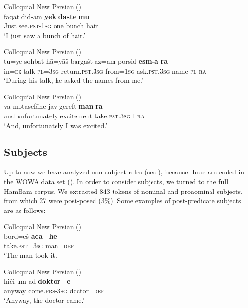 \documentclass[output=paper,colorlinks,citecolor=brown,draftmode]{langscibook}
\begin{document}
\ea\label{Persian:ex:29}
Colloquial New Persian (\citealt[Q, 1919]{Izadi2022Persian}) \\
\gll faqat did-am \textbf{yek} \textbf{daste} \textbf{mu} \\
Just see\textsc{.pst-1sg} one bunch hair \\
\glt `I just saw a bunch of hair.'
\z

\ea\label{Persian:ex:30}
Colloquial New Persian (\citealt[ZB, 3034]{Izadi2022Persian}) \\
\gll tu=ye sohbat-hā=yāš bargašt az=am porsid \textbf{esm-ā} \textbf{rā} \\
in\textsc{=ez} talk\textsc{-pl=3sg} return\textsc{.pst.3sg} from\textsc{=1sg} ask\textsc{.pst.3sg} name\textsc{-pl} \textsc{ra} \\
\glt `During his talk, he asked the names from me.'
\z

\ea\label{Persian:ex:31}
Colloquial New Persian (\citealt[ZA, 2939]{Izadi2022Persian}) \\
\gll va motasefāne jav gereft \textbf{man} \textbf{rā} \\
and unfortunately excitement take\textsc{.pst.3sg} I \textsc{ra} \\
\glt `And, unfortunately I was excited.'
\z

\subsection{Subjects}\label{Persian:3.3}

Up to now we have analyzed non-subject roles (see ), because these are coded in the WOWA data set (\citealt{Izadi2022Persian}). In order to consider subjects, we turned to the full HamBam corpus. We extracted 843 tokens of nominal and pronominal subjects, from which 27 were post-posed (3\%). Some examples of post-predicate subjects are as follows:

\ea\label{Persian:ex:32}
Colloquial New Persian (\citealt[F, 0657]{Izadi2022Persian}) \\
\gll bord=eš \textbf{āqā=he} \\
take\textsc{.pst=3sg} man\textsc{=def} \\
\glt `The man took it.'
\z

\ea\label{Persian:ex:33}
Colloquial New Persian (\citealt[F, 0754]{Izadi2022Persian}) \\
\gll hiči um-ad \textbf{doktor=e} \\
anyway come\textsc{.prs-3sg} doctor\textsc{=def} \\
\glt `Anyway, the doctor came.'
\z
\end{document}

